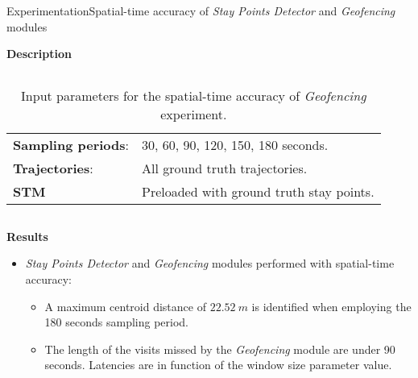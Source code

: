 \begin{frame}{Experimentation}{Spatial-time accuracy of \emph{Stay Points Detector} and \emph{Geofencing} modules}
\begin{block}{\small \textbf{Description}}
\begin{columns}
\begin{column}[T]{0.5\textwidth}
\begin{table}
{\begin{tabular}{lll}
\cmidrule[0.25pt]{1-3}
\textbf{Sampling periods}: & \multicolumn{2}{l}{30, 60, 90, 120, 150, 180 seconds.} \\

\cmidrule[0.25pt]{1-3}
\textbf{Trajectories}: & \multicolumn{2}{l}{All ground truth trajectories.} \\

\cmidrule[0.25pt]{1-3}
\textbf{STM} & \multicolumn{2}{l}{Preloaded with ground truth stay points.} \\
\bottomrule
\end{tabular}
}
\caption{Input parameters for the spatial-time accuracy of \emph{Geofencing} experiment.}
\end{table}
\end{column}
\end{columns}
\end{block}

\begin{block}{\small \textbf{Results}}
\begin{itemize}
  \item \emph{Stay Points Detector} and \emph{Geofencing} modules performed with spatial-time accuracy:
\begin{itemize}
  \item A maximum centroid distance of $22.52~m$ is identified when employing the 180 seconds sampling period.
  \item The length of the visits missed by the \emph{Geofencing} module are under 90 seconds. Latencies are in function of the window size parameter value.
\end{itemize}
\end{itemize}
\end{block}


\end{frame}




